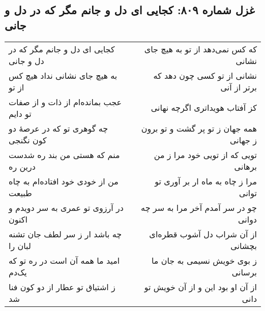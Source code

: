 \begin{center}
\section*{غزل شماره ۸۰۹: کجایی ای دل و جانم مگر که در دل و جانی}
\label{sec:809}
\begin{longtable}{l p{0.5cm} r}
کجایی ای دل و جانم مگر که در دل و جانی
&&
که کس نمی‌دهد از تو به هیچ جای نشانی
\\
به هیچ جای نشانی نداد هیچ کس از تو
&&
نشانی از تو کسی چون دهد که برتر از آنی
\\
عجب بمانده‌ام از ذات و از صفات تو دایم
&&
کز آفتاب هویداتری اگرچه نهانی
\\
چه گوهری تو که در عرصهٔ دو کون نگنجی
&&
همه جهان ز تو پر گشت و تو برون ز جهانی
\\
منم که هستی من بند ره شدست درین ره
&&
تویی که از تویی خود مرا ز من برهانی
\\
من از خودی خود افتاده‌ام به چاه طبیعت
&&
مرا ز چاه به ماه ار بر آوری تو توانی
\\
در آرزوی تو عمری به سر دویدم و اکنون
&&
چو در سر آمدم آخر مرا به سر چه دوانی
\\
چه باشد ار ز سر لطف جان تشنه لبان را
&&
از آن شراب دل آشوب قطره‌ای بچشانی
\\
امید ما همه آن است در ره تو که یک‌دم
&&
ز بوی خویش نسیمی به جان ما برسانی
\\
ز اشتیاق تو عطار از دو کون فنا شد
&&
از آن او بود این و از آن خویش تو دانی
\\
\end{longtable}
\end{center}
